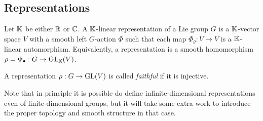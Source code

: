 \subsection{Representations}

\begin{defn}
    Let $\mathbb{K}$ be either $\mathbb{R}$ or $\mathbb{C}$. A $\mathbb{K}$-linear representation of a Lie group $G$ is a $\mathbb{K}$-vector space $V$ with a smooth left $G$-action $\Phi$ such that each map $\Phi_g:V\to V$ is a $\mathbb{K}$-linear automorphism. Equivalently, a representation is a smooth homomorphism $\rho=\Phi_\bullet:G\to \operatorname{GL}_{\mathbb{K}}(V)$. 

    A representation $\rho :G\to \operatorname{GL}(V)$ is called \emph{faithful} if it is injective.
\end{defn}
Note that in principle it is possible do define infinite-dimensional representations even of finite-dimensional groups, but it will take some extra work to introduce the proper topology and smooth structure in that case.

